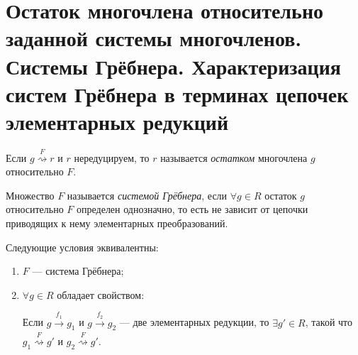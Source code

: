 \section{Остаток многочлена относительно заданной системы многочленов. Системы Грёбнера. Характеризация систем Грёбнера в терминах цепочек элементарных редукций}

\begin{definition}
    Если $g \overset{F}{\rightsquigarrow} r$ и $r$ нередуцируем, то $r$ называется \textit{остатком} многочлена $g$ относительно $F$.
\end{definition}

\begin{comment}
    Вообще говоря, остаток определен неоднозначно.
\end{comment}

\begin{definition}
    Множество $F$ называется \textit{системой Грёбнера}, если $\forall g \in R$ остаток $g$ относительно $F$ определен однозначно, то есть не зависит от цепочки приводящих к нему элементарных преобразований.
\end{definition}

\begin{proposal}
    Следующие условия эквивалентны:
    \begin{enumerate}
    \item $F$ --- система Грёбнера;
    \item $\forall g \in R$ обладает свойством:

        Если $g \xrightarrow[]{f_1} g_1$ и $g \xrightarrow[]{f_2} g_2$ --- две элементарных редукции, то $\exists g' \in R$, такой что 
        \begin{math}
            g_1 \overset{F}{\rightsquigarrow} g' \text{ и } g_2 \overset{F}{\rightsquigarrow} g'.
        \end{math}
    \end{enumerate}
\end{proposal}

